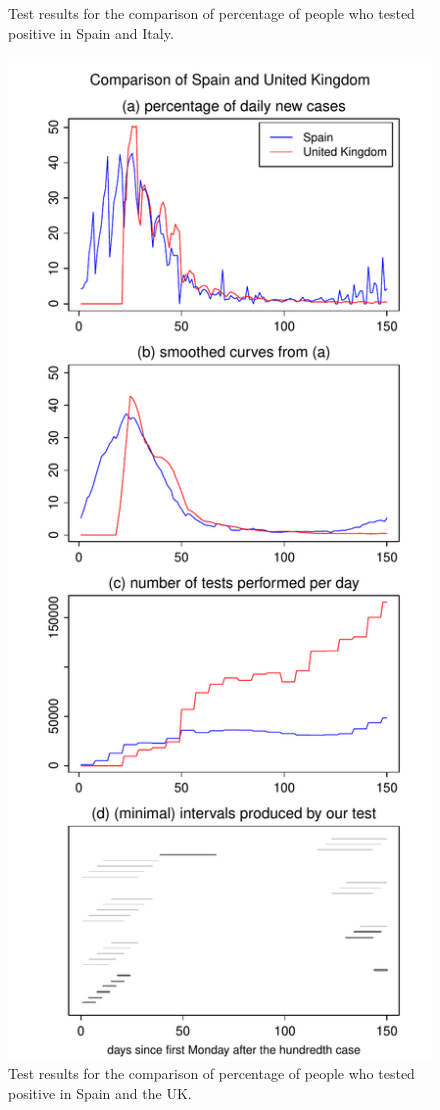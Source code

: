 \documentclass[a4paper,12pt]{article}
\numberwithin{equation}{section}
\begin{document}
\begin{figure}[p!]
\begin{minipage}[t]{0.49\textwidth}
\caption{Test results for the comparison of percentage of people who tested positive in Spain and Italy.}
\end{minipage}
\hspace{0.25cm}
\begin{minipage}[t]{0.49\textwidth}
\includegraphics[width=\textwidth]{plots/ESP_vs_GBR_normalised}
\caption{Test results for the comparison of percentage of people who tested positive in Spain and the UK.}
\end{minipage}
\end{figure}
\end{document}
